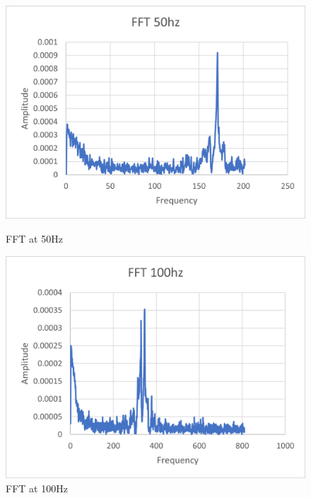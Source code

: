 \documentclass{article}
\begin{document}
\begin{figure}[H]
\begin{minipage}{.5\textwidth}
    \end{minipage}
    \begin{minipage}{.5\textwidth}
      \centering
      \includegraphics[width=.95\linewidth]{lab5images/FFT50hz.png}
      \caption{FFT at 50Hz}
      \label{fig:fft50hz}
    \end{minipage}%
    \begin{minipage}{.5\textwidth}
      \centering
      \includegraphics[width=.95\linewidth]{lab5images/FFT100hz.png}
      \caption{FFT at 100Hz}
      \label{fig:fft100hz}
    \end{minipage}
    \begin{minipage}{.5\textwidth}
      \centering

\end{minipage}
\end{figure}
\end{document}
